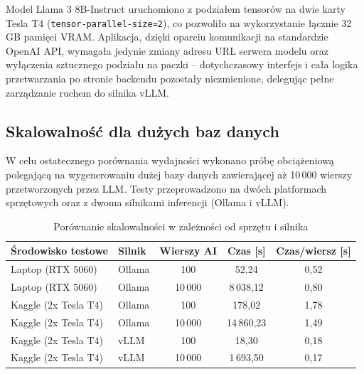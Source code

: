 Model Llama 3 8B-Instruct uruchomiono z podziałem tensorów na dwie karty Tesla T4 (\texttt{tensor-parallel-size=2}), co pozwoliło na wykorzystanie łącznie 32 GB pamięci VRAM. Aplikacja, dzięki oparciu komunikacji na standardzie OpenAI API, wymagała jedynie zmiany adresu URL serwera modelu oraz wyłączenia sztucznego podziału na paczki -- dotychczasowy interfejs i cała logika przetwarzania po stronie backendu pozostały niezmienione, delegując pełne zarządzanie ruchem do silnika vLLM.

\subsection*{Skalowalność dla dużych baz danych}

W celu ostatecznego porównania wydajności wykonano próbę obciążeniową polegającą na wygenerowaniu dużej bazy danych zawierającej aż 10\,000 wierszy przetworzonych przez LLM. Testy przeprowadzono na dwóch platformach sprzętowych oraz z dwoma silnikami inferencji (Ollama i vLLM).

\begin{table}[H]
    \centering
    \begin{tabular}{|l|l|c|c|c|}
        \hline
        \textbf{Środowisko testowe} & \textbf{Silnik} & \textbf{Wierszy AI} & \textbf{Czas [s]} & \textbf{Czas/wiersz [s]} \\
        \hline
        Laptop (RTX 5060)           & Ollama          & 100                 & 52,24             & 0,52                     \\
        \hline
        Laptop (RTX 5060)           & Ollama          & 10\,000             & 8\,038,12         & 0,80                     \\
        \hline
        Kaggle (2x Tesla T4)        & Ollama          & 100                 & 178,02            & 1,78                     \\
        \hline
        Kaggle (2x Tesla T4)        & Ollama          & 10\,000             & 14\,860,23        & 1,49                     \\
        \hline
        Kaggle (2x Tesla T4)        & vLLM            & 100                 & 18,30             & 0,18                     \\
        \hline
        Kaggle (2x Tesla T4)        & vLLM            & 10\,000             & 1\,693,50         & 0,17                     \\
        \hline
    \end{tabular}
    \caption{Porównanie skalowalności w zależności od sprzętu i silnika}
    \label{tab:llm_scalability}
\end{table}

